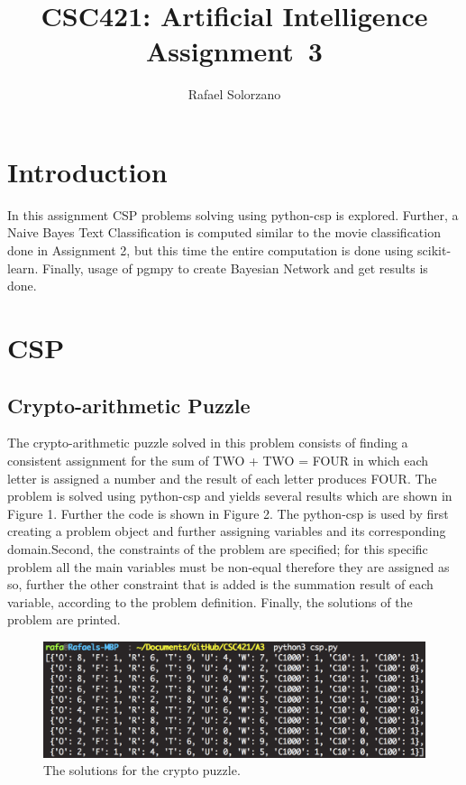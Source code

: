 \documentclass[12pt, letter]{article}
\newcommand{\courseName}{CSC421: Artificial Intelligence}
\newcommand{\assignName}{Assignment~3}
\begin{document}
\pagestyle{titlesec_assignment}

\title{\courseName\\\assignName}
\author{Rafael Solorzano}
\maketitle

\section{Introduction}

In this assignment CSP problems solving using python-csp is explored. Further, a Naive Bayes Text Classification is computed similar to the movie classification done in Assignment 2, but this time the entire computation is done using scikit-learn. Finally, usage of pgmpy to create Bayesian Network and get results is done.  

\section{CSP}

\subsection{Crypto-arithmetic Puzzle}

The crypto-arithmetic puzzle solved in this problem consists of finding a consistent assignment for the sum of TWO + TWO = FOUR in which each letter is assigned a number and the result of each letter produces FOUR. The problem is solved using python-csp and yields several results which are shown in Figure 1. Further the code is shown in Figure 2. The python-csp is used by first creating a problem object and further assigning variables and its corresponding domain.Second, the constraints of the problem are specified; for this specific problem all the main variables must be non-equal therefore they are assigned as so, further the other constraint that is added is the summation result of each variable, according to the problem definition. Finally, the solutions of the problem are printed. 

 \begin{figure}[htb]
  \centering
  \includegraphics[width=0.75 \textwidth]{./figures/csp_results.png}
  \caption{The solutions for the crypto puzzle.}
\end{figure}
\end{document}
